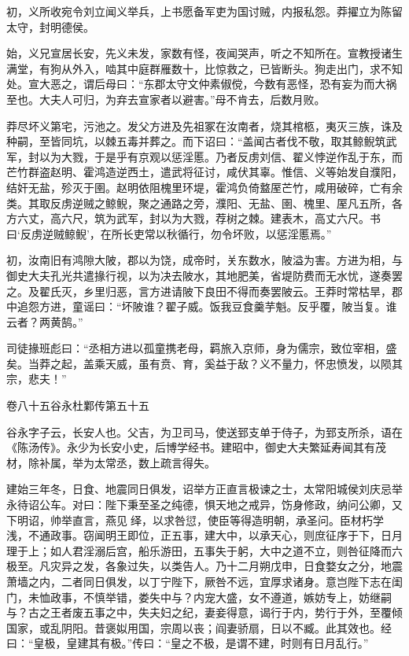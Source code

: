 \documentclass[12pt,UTF8]{ctexbook}
\begin{document}
初，义所收宛令刘立闻义举兵，上书愿备军吏为国讨贼，内报私怨。莽擢立为陈留太守，封明德侯。



始，义兄宣居长安，先义未发，家数有怪，夜闻哭声，听之不知所在。宣教授诸生满堂，有狗从外入，啮其中庭群雁数十，比惊救之，已皆断头。狗走出门，求不知处。宣大恶之，谓后母曰：“东郡太守文仲素俶傥，今数有恶怪，恐有妄为而大祸至也。大夫人可归，为弃去宣家者以避害。”母不肯去，后数月败。



莽尽坏义第宅，污池之。发父方进及先祖冢在汝南者，烧其棺柩，夷灭三族，诛及种嗣，至皆同坑，以棘五毒并葬之。而下诏曰：“盖闻古者伐不敬，取其鲸鲵筑武军，封以为大戮，于是乎有京观以惩淫慝。乃者反虏刘信、翟义悖逆作乱于东，而芒竹群盗赵明、霍鸿造逆西土，遣武将征讨，咸伏其辜。惟信、义等始发自濮阳，结奸无盐，殄灭于圉。赵明依阻槐里环堤，霍鸿负倚盩厔芒竹，咸用破碎，亡有余类。其取反虏逆贼之鲸鲵，聚之通路之旁，濮阳、无盐、圉、槐里、厔凡五所，各方六丈，高六尺，筑为武军，封以为大戮，荐树之棘。建表木，高丈六尺。书曰‘反虏逆贼鲸鲵’，在所长吏常以秋循行，勿令坏败，以惩淫慝焉。”



初，汝南旧有鸿隙大陂，郡以为饶，成帝时，关东数水，陂溢为害。方进为相，与御史大夫孔光共遣掾行视，以为决去陂水，其地肥美，省堤防费而无水忧，遂奏罢之。及翟氏灭，乡里归恶，言方进请陂下良田不得而奏罢陂云。王莽时常枯旱，郡中追怨方进，童谣曰：“坏陂谁？翟子威。饭我豆食羹芋魁。反乎覆，陂当复。谁云者？两黄鹄。”



司徒掾班彪曰：“丞相方进以孤童携老母，羁旅入京师，身为儒宗，致位宰相，盛矣。当莽之起，盖乘天威，虽有贲、育，奚益于敌？义不量力，怀忠愤发，以陨其宗，悲夫！”





卷八十五谷永杜鄴传第五十五



谷永字子云，长安人也。父吉，为卫司马，使送郅支单于侍子，为郅支所杀，语在《陈汤传》。永少为长安小史，后博学经书。建昭中，御史大夫繁延寿闻其有茂材，除补属，举为太常丞，数上疏言得失。



建始三年冬，日食、地震同日俱发，诏举方正直言极谏之士，太常阳城侯刘庆忌举永待诏公车。对曰：陛下秉至圣之纯德，惧天地之戒异，饬身修政，纳问公卿，又下明诏，帅举直言，燕见绎，以求咎愆，使臣等得造明朝，承圣问。臣材朽学浅，不通政事。窃闻明王即位，正五事，建大中，以承天心，则庶征序于下，日月理于上；如人君淫溺后宫，船乐游田，五事失于躬，大中之道不立，则咎征降而六极至。凡灾异之发，各象过失，以类告人。乃十二月朔戊申，日食婺女之分，地震萧墙之内，二者同日俱发，以丁宁陛下，厥咎不远，宜厚求诸身。意岂陛下志在闺门，未恤政事，不慎举错，娄失中与？内宠大盛，女不遵道，嫉妨专上，妨继嗣与？古之王者废五事之中，失夫妇之纪，妻妾得意，谒行于内，势行于外，至覆倾国家，或乱阴阳。昔褒姒用国，宗周以丧；阎妻骄扇，日以不臧。此其效也。经曰：“皇极，皇建其有极。”传曰：“皇之不极，是谓不建，时则有日月乱行。”
\end{document}
